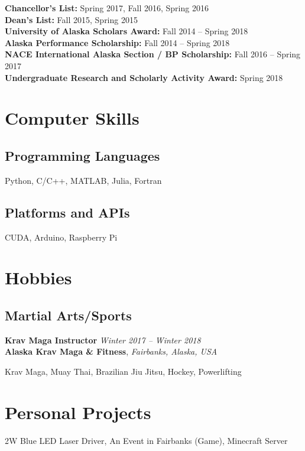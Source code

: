 \documentclass[12pt,a4paper]{article}
\begin{document}
\textbf{Chancellor’s List:} Spring 2017, Fall 2016, Spring 2016\\
\textbf{Dean’s List:} Fall 2015, Spring 2015\\
\textbf{University of Alaska Scholars Award:} Fall 2014 – Spring 2018\\
\textbf{Alaska Performance Scholarship:} Fall 2014 – Spring 2018\\
\textbf{NACE International Alaska Section / BP Scholarship:} Fall 2016 – Spring 2017\\
\textbf{Undergraduate Research and Scholarly Activity Award:} Spring 2018

\section*{Computer Skills}

\subsection*{Programming Languages}

Python, C/C++, MATLAB, Julia, Fortran

\subsection*{Platforms and APIs}

CUDA, Arduino, Raspberry Pi

\section*{Hobbies}

\subsection*{Martial Arts/Sports}

\textbf{Krav Maga Instructor} \textit{Winter 2017 – Winter 2018}\\
\textbf{Alaska Krav Maga \& Fitness}, \textit{Fairbanks, Alaska, USA}

Krav Maga, Muay Thai, Brazilian Jiu Jitsu, Hockey, Powerlifting

\section*{Personal Projects}

2W Blue LED Laser Driver, An Event in Fairbanks (Game), Minecraft Server
\end{document}
